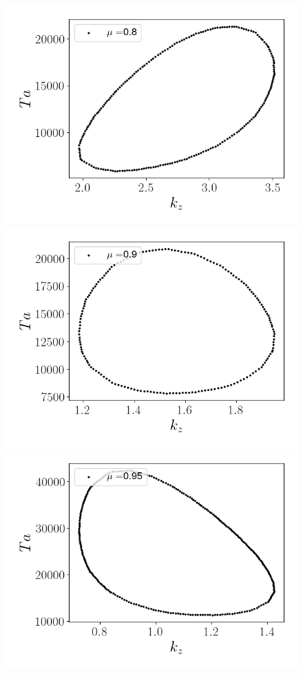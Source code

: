 \documentclass[varwidth]{standalone}
\begin{document}
\begin{figure}
\includegraphics[scale = 0.18]{island_eta_0.9_mu_0.8_m_-20.png} \\
\includegraphics[scale = 0.18]{island_eta_0.9_mu_0.9_m_-20.png} 
\includegraphics[scale = 0.18]{island_eta_0.9_mu_0.95_m_-20.png} 

\end{figure}
\end{document}
